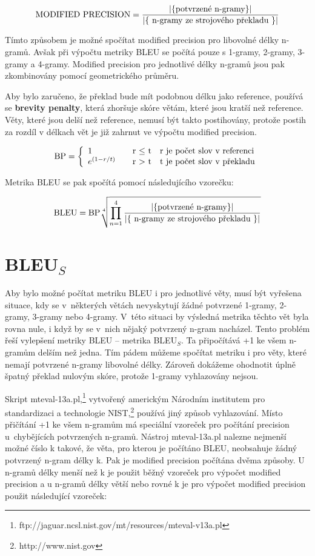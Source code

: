 $$ \text{MODIFIED PRECISION} = \frac{\lvert \lbrace \text{potvrzené \mbox{n-gramy}} \rbrace \rvert }{ \lvert \lbrace \text{ \mbox{n-gramy} ze strojového překladu } \rbrace \rvert } $$

Tímto způsobem je možné spočítat modified precision pro libovolné délky \mbox{n-gramů}.
Avšak při výpočtu metriky BLEU se počítá pouze s \mbox{1-gramy}, \mbox{2-gramy}, \mbox{3-gramy} a \mbox{4-gramy}.
Modified precision pro jednotlivé délky \mbox{n-gramů} jsou pak zkombinovány pomocí geometrického průměru.

Aby bylo zaručeno,
  že překlad bude mít podobnou délku jako reference,
  používá se \textbf{brevity penalty},
  která zhoršuje skóre větám, které jsou kratší než reference.
Věty, které jsou delší než reference,
  nemusí být takto postihovány,
  protože postih za rozdíl v délkach vět je již zahrnut ve výpočtu modified precision.

$$
\text{BP} = \left\{
	\begin{array}{l l l}
		1 & \quad \text{r $\leq$ t} & \text{r je počet slov v referenci} \\
		e^{(1-r/t)} & \quad \text{r $>$ t} & \text{t je počet slov v překladu}
	\end{array}
\right.
$$


Metrika BLEU se pak spočítá pomocí následujícího vzorečku:

$$ \text{BLEU} = \text{BP} \sqrt[4]{\prod_{n=1}^{4} \frac{\lvert \lbrace \text{potvrzené \mbox{n-gramy}} \rbrace \rvert }{ \lvert \lbrace \text{ \mbox{n-gramy} ze strojového překladu } \rbrace \rvert }} $$


\section{BLEU${}_S$}
Aby bylo možné počítat metriku BLEU i pro jednotlivé věty,
  musí být vyřešena situace,
  kdy se v~některých větách nevyskytují žádné potvrzené \mbox{1-gramy}, \mbox{2-gramy}, \mbox{3-gramy} nebo \mbox{4-gramy}.
V~této situaci by výsledná metrika těchto vět byla rovna nule,
  i když by se v~nich nějaký potvrzený \mbox{n-gram} nacházel.
Tento problém řeší vylepšení metriky BLEU -- metrika BLEU${}_S$. %
Ta připočítává +1 ke všem \mbox{n-gramům} delším než jedna.
Tím pádem můžeme spočítat metriku i pro věty,
  které nemají potvrzené \mbox{n-gramy} libovolné délky.
Zároveň dokážeme ohodnotit úplně špatný překlad nulovým skóre,
  protože \mbox{1-gramy} vyhlazovány nejsou.

Skript mteval-13a.pl,\footnote{ftp://jaguar.ncsl.nist.gov/mt/resources/mteval-v13a.pl}
  vytvořený americkým Národním institutem pro standardizaci a technologie NIST,\footnote{http://www.nist.gov}
  používá jiný způsob vyhlazování.
Místo přičítání +1 ke všem \mbox{n-gramům} má speciální vzoreček pro počítání precision u~chybějících potvrzených \mbox{n-gramů}.
Nástroj mteval-13a.pl nalezne nejmenší možné číslo k takové,
  že věta, pro kterou je počítáno BLEU,
  neobsahuje žádný potvrzený \mbox{n-gram} délky k.
Pak je modified precision počítána dvěma způsoby.
U \mbox{n-gramů} délky menší než k je použit běžný vzoreček pro výpočet modified precision a
  u \mbox{n-gramů} délky větší nebo rovné k je pro výpočet modified precision použit následující vzoreček:


